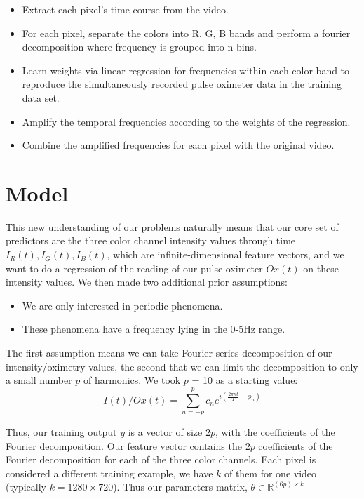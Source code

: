 \documentclass[12pt]{article}
\begin{document}
\begin{itemize}
\item Extract each pixel’s time course from the video. 
\item For each pixel, separate the colors into R, G, B bands and perform a fourier decomposition where frequency is grouped into n bins.
\item Learn weights via linear regression for frequencies within each color band to reproduce the simultaneously recorded pulse oximeter data in the training data set. 
\item Amplify the temporal frequencies according to the weights of the regression.
\item Combine the amplified frequencies for each pixel with the original video.
\end{itemize}


  


\section{Model}
  This new understanding of our problems naturally means that our core set of predictors are the three color channel intensity values through
  time \(I_R(t), I_G(t), I_B(t)\), which are infinite-dimensional feature vectors, and we want to do a regression of the reading of our pulse oximeter $Ox(t)$ 
  on these intensity values.
  We then made two additional prior assumptions:
  \begin{itemize}
    \item We are only interested in periodic phenomena.
    \item These phenomena have a frequency lying in the 0-5Hz range.
  \end{itemize}

  The first assumption means we can take Fourier series decomposition of our intensity/oximetry values, the second that we can
  limit the decomposition to only a small number $p$ of harmonics. We took $p$ = 10 as a starting value:
  \[
    I(t)/Ox(t) = \sum_{n=-p}^{p} c_n e^{i \left(\frac{2\pi nt}{T}  + \phi_n \right) }
  \]

  Thus, our training output $y$ is a vector of size $2p$, with the coefficients of the Fourier decomposition.
  Our feature vector contains the $2p$ coefficients of the Fourier decomposition for each of the three color channels.
  Each pixel is considered a different training example, we have $k$ of them for one video (typically \(k=1280\times 720\)).
  Thus our parameters matrix, $\theta \in \mathbb{R}^{(6p) \times k}$
\end{document}
